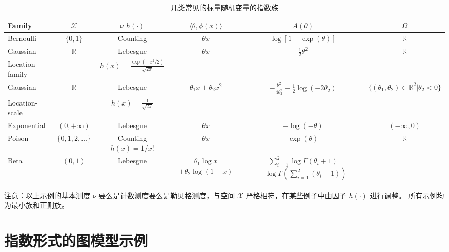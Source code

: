 \begin{sidewaystable}[htbp]
\caption{
    几类常见的标量随机变量的指数族
}\label{tab:3-1}
\centering
\begin{threeparttable}
\begin{tabular}{lccccc}
    \hline
    Family & $\mathcal{X}$ & \tabincell{c}{$\nu$ \\ $h(\cdot)$} & $\langle \theta, \phi(x) \rangle$ & $A(\theta)$ & $\Omega$ \\
    \hline
    Bernoulli & $\{0, 1\}$ & Counting & $\theta x$ & $\log{[1+\exp{(\theta)}]}$ & $\mathbb{R}$ \\
    Gaussian & $\mathbb{R}$ & Lebesgue & $\theta x$ & $\frac{1}{2}\theta^2$ & $\mathbb{R}$ \\
    Location family & & $h(x) = \frac{\exp{(-x^2/2)}}{\sqrt{2\pi}}$ & & & \\
    Gaussian & $\mathbb{R}$ & Lebesgue & $\theta_1x + \theta_2x^2$ & $-\frac{\theta_1^2}{4\theta_2^2} - \frac{1}{2}\log{(-2\theta_2)}$ & $\{(\theta_1, \theta_2) \in \mathbb{R}^2| \theta_2 < 0\}$ \\
    Location-scale & & $h(x) = \frac{1}{\sqrt{2\pi}}$ & & & \\
    Exponential & $(0, +\infty)$ & Lebesgue & $\theta x$ & $-\log{(-\theta)}$ & $(-\infty, 0)$ \\
    Poison & $\{0, 1, 2, \dots\}$ & \tabincell{c}{Counting \\ $h(x) = 1/x!$} & $\theta x$ & $\exp{(\theta)}$ & $\mathbb{R}$ \\
    Beta & $(0, 1)$ & Lebesgue & \tabincell{c}{$\theta_1\log{x}$ \\ $+\theta_2\log{(1-x)}$} & \tabincell{c}{$\sum_{i = 1}^2\log{\Gamma(\theta_i+1)}$ \\ $-\log{\Gamma(\sum_{i = 1}^2(\theta_i+1))}$} & \\
    \hline
\end{tabular}
\begin{tablenotes}
    \item 注意：以上示例的基本测度 $\nu$ 要么是计数测度要么是勒贝格测度，与空间 $\mathcal{X}$ 严格相符，在某些例子中由因子 $h(\cdot)$ 进行调整。
        所有示例均为最小族和正则族。
\end{tablenotes}
\end{threeparttable}
\end{sidewaystable}

\section{指数形式的图模型示例}

